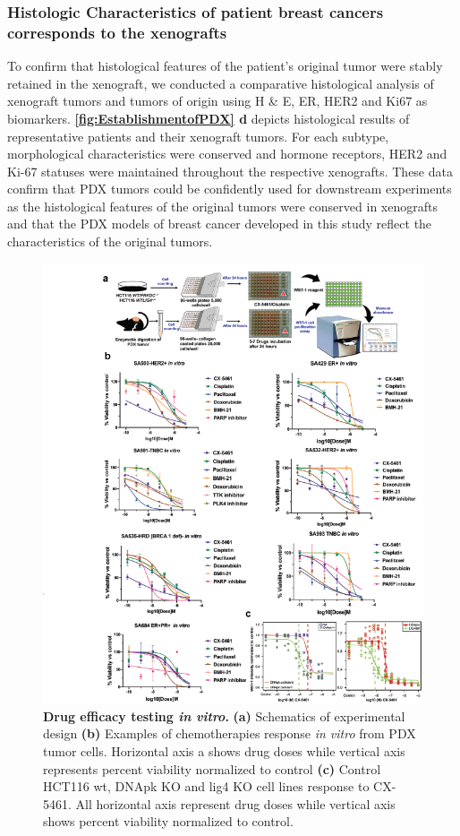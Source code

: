 \subsubsection{Histologic Characteristics of patient breast cancers corresponds to the xenografts}

To confirm that histological features of the patient’s original tumor were stably retained in the xenograft, we conducted a comparative histological analysis of xenograft tumors and tumors of origin using H \& E, ER, HER2 and Ki67 as biomarkers. 
\textbf{\autoref{fig:EstablishmentofPDX} d} depicts histological results of representative patients and their xenograft tumors. For each subtype, morphological characteristics were conserved and hormone receptors, HER2 and Ki-67 statuses were maintained throughout the respective xenografts. These data confirm that PDX tumors could be confidently used for downstream experiments as the histological features of the original tumors were conserved in xenografts and that the PDX models of breast cancer developed in this study reflect the characteristics of the original tumors.
\begin{figure}
	\centering
	\includegraphics[width=\textwidth]{Figures/invitro.png}
	\caption[Drug efficacy testing \textit{in vitro} ]
	{\small
	    \textbf{Drug efficacy testing \textit{in vitro}.}
	    \textbf{(a)} Schematics of experimental design
	    \textbf{(b)} Examples of chemotherapies response \textit{in vitro} from PDX tumor cells. Horizontal axis a shows drug doses while vertical axis represents percent viability normalized to control
	    \textbf{(c)} Control HCT116 wt, DNApk KO and lig4 KO cell lines response to CX-5461. All horizontal axis represent drug doses while vertical axis shows percent viability normalized to control.
	}
	\label{fig:invitro}
\end{figure}
